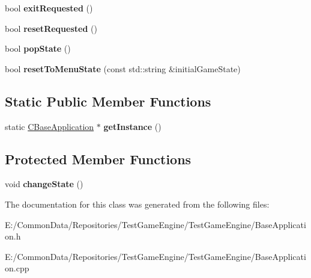 \begin{DoxyCompactItemize}
bool {\bfseries exit\+Requested} ()
\item 
\mbox{\label{class_application_1_1_c_base_application_a6aea9ecd1c50306a49407ef343d2b73a}} 
bool {\bfseries reset\+Requested} ()
\item 
\mbox{\label{class_application_1_1_c_base_application_a7bb94618b73bd63461712420411e4419}} 
bool {\bfseries pop\+State} ()
\item 
\mbox{\label{class_application_1_1_c_base_application_aa18f468aa1c9446ddc24a54918e5fdec}} 
bool {\bfseries reset\+To\+Menu\+State} (const std\+::string \&initial\+Game\+State)
\end{DoxyCompactItemize}
\subsection*{Static Public Member Functions}
\begin{DoxyCompactItemize}
\item 
\mbox{\label{class_application_1_1_c_base_application_a57a44837084763c4658e632ea5c74307}} 
static \mbox{\hyperlink{class_application_1_1_c_base_application}{C\+Base\+Application}} $\ast$ {\bfseries get\+Instance} ()
\end{DoxyCompactItemize}
\subsection*{Protected Member Functions}
\begin{DoxyCompactItemize}
\item 
\mbox{\label{class_application_1_1_c_base_application_a9183ed87be5aeafc4b131c9a39990a93}} 
void {\bfseries change\+State} ()
\end{DoxyCompactItemize}


The documentation for this class was generated from the following files\+:\begin{DoxyCompactItemize}
\item 
E\+:/\+Common\+Data/\+Repositories/\+Test\+Game\+Engine/\+Test\+Game\+Engine/Base\+Application.\+h\item 
E\+:/\+Common\+Data/\+Repositories/\+Test\+Game\+Engine/\+Test\+Game\+Engine/Base\+Application.\+cpp\end{DoxyCompactItemize}
